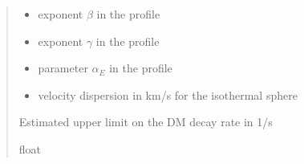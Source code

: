 \documentclass[letterpaper,10pt,english]{sphinxmanual}
\begin{document}
\begin{fulllineitems}
\begin{quote}
\begin{description}
\begin{itemize}
\item {} 
\sphinxAtStartPar
{} \textendash{} exponent \(\beta\) in the {\hyperref[\detokenize{diffsph.profiles:diffsph.profiles.templates.hdz}]{}} profile

\item {} 
\sphinxAtStartPar
{} \textendash{} exponent \(\gamma\) in the {\hyperref[\detokenize{diffsph.profiles:diffsph.profiles.templates.hdz}]{}} profile

\item {} 
\sphinxAtStartPar
{} \textendash{} parameter \(\alpha_E\) in the {\hyperref[\detokenize{diffsph.profiles:diffsph.profiles.templates.enst}]{}} profile

\item {} 
\sphinxAtStartPar
{} \textendash{} velocity dispersion in km/s for the isothermal sphere {\hyperref[\detokenize{diffsph.profiles:diffsph.profiles.templates.sis}]{}}

\end{itemize}

\sphinxAtStartPar
Estimated upper limit on the DM decay rate in 1/s

\sphinxAtStartPar
float

\end{description}\end{quote}

\end{fulllineitems}

\end{document}
